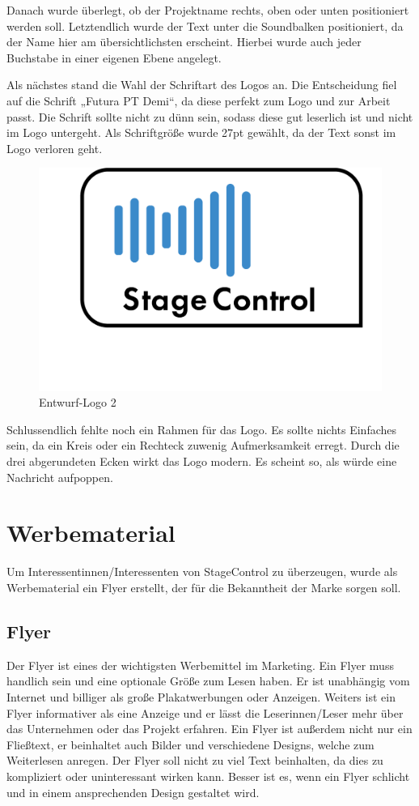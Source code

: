 Danach wurde überlegt, ob der Projektname rechts, oben oder unten positioniert werden soll. Letztendlich wurde der Text unter die Soundbalken positioniert, da der Name hier am übersichtlichsten erscheint. Hierbei wurde auch jeder Buchstabe in einer eigenen Ebene angelegt. 

\newpage
Als nächstes stand die Wahl der Schriftart des Logos an. Die Entscheidung fiel auf die Schrift „Futura PT Demi“, da diese perfekt zum Logo und zur Arbeit passt. Die Schrift sollte nicht zu dünn sein, sodass diese gut leserlich ist und nicht im Logo untergeht. Als Schriftgröße wurde 27pt gewählt, da der Text sonst im Logo verloren geht. 

\begin{figure}[H]
	\centering
	\includegraphics[width=0.5\linewidth]{images/Logo-Entwurf.png}
	\caption[Entwurf-Logo]{Entwurf-Logo 2}
	\label{fig:Entwurf-Logo2}
\end{figure}

Schlussendlich fehlte noch ein Rahmen für das Logo. Es sollte nichts Einfaches sein, da ein Kreis oder ein Rechteck zuwenig Aufmerksamkeit erregt. Durch die drei abgerundeten Ecken  wirkt das Logo modern. Es scheint so, als würde eine Nachricht aufpoppen. 

\section{Werbematerial}
Um Interessentinnen/Interessenten von StageControl zu überzeugen, wurde als Werbematerial ein Flyer erstellt, der für die Bekanntheit der Marke sorgen soll.

\subsection{Flyer}
Der Flyer ist eines der wichtigsten Werbemittel im Marketing. Ein Flyer muss handlich sein und eine optionale Größe zum Lesen haben. Er ist unabhängig vom Internet und billiger als große Plakatwerbungen oder Anzeigen. Weiters ist ein Flyer informativer als eine Anzeige und er lässt die Leserinnen/Leser mehr über das Unternehmen oder das Projekt erfahren. Ein Flyer ist außerdem nicht nur ein Fließtext, er beinhaltet auch Bilder und verschiedene Designs, welche zum Weiterlesen anregen. Der Flyer soll nicht zu viel Text beinhalten, da dies zu kompliziert oder uninteressant wirken kann. Besser ist es, wenn ein Flyer schlicht und in einem ansprechenden Design gestaltet wird. \parencite{VorteilevonFlyern}

